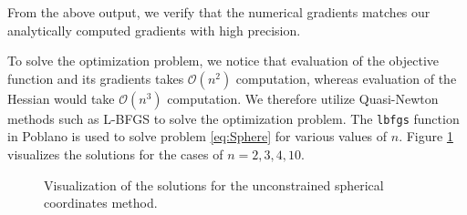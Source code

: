 \documentclass[11pt]{article}
\begin{document}
\noindent From the above output, we verify that the numerical gradients matches our analytically computed gradients with high precision. 

To solve the optimization problem, we notice that evaluation of the objective function and its gradients takes $\mathcal{O}(n^2)$ computation, whereas evaluation of the Hessian would take $\mathcal{O}(n^3)$ computation.
We therefore utilize Quasi-Newton methods such as L-BFGS to solve the optimization problem.
The \texttt{lbfgs} function in Poblano is used to solve problem \eqref{eq:Sphere} for various values of $n$. Figure \ref{fig:SphereResults} visualizes the solutions for the cases of $n=2, 3, 4, 10$.

\begin{figure}[!htb]
  \centering
  \caption{Visualization of the solutions for the unconstrained spherical coordinates method.}
  \label{fig:SphereResults}
\end{figure}
\end{document}
